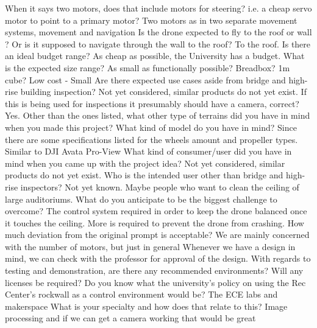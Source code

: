 \documentclass[12pt]{article}
\begin{document}
            \qna
            {When it says two motors, does that include motors for steering? i.e. a cheap servo motor to point to a primary motor?}
            {Two motors as in two separate movement systems, movement and navigation}
            \qna
            {Is the drone expected to fly to the roof or wall ? Or is it supposed to navigate through the wall to the roof?}
            {To the roof.}
            \qna
            {Is there an ideal budget range?}
            {As cheap as possible, the University has a budget.}
            \qna
            {What is the expected size range? As small as functionally possible? Breadbox? 1m cube?}
            {Low cost -\> Small}
            \qna
            {Are there expected use cases aside from bridge and high-rise building inspection?}
            {Not yet considered, similar products do not yet exist.}
            \qna
            {If this is being used for inspections it presumably should have a camera, correct?}
            {Yes.}
            \qna
            {Other than the ones listed, what other type of terrains did you have in mind when you made this project?}
            {}
            \qna
            {What kind of model do you have in mind? Since there are some specifications listed for the wheels amount and propeller types.}
            {Similar to DJI Avata Pro-View}
            \qna
            {What kind of consumer/user did you have in mind when you came up with the project idea?}
            {Not yet considered, similar products do not yet exist.}
            \qna
            {Who is the intended user other than bridge and high-rise inspectors?}
            {Not yet known. Maybe people who want to clean the ceiling of large auditoriums.}
            \qna
            {What do you anticipate to be the biggest challenge to overcome?}
            {The control system required in order to keep the drone balanced once it touches the ceiling. More is required to prevent the drone from crashing.}
            \qna
            {How much deviation from the original prompt is acceptable? We are mainly concerned with the number of motors, but just in general}
            {Whenever we have a design in mind, we can check with the professor for approval of the design.}
            \qna
            {With regards to testing and demonstration, are there any recommended environments? Will any licenses be required? Do you know what the university's policy on using the Rec Center's rockwall as a control environment would be?}
            {The ECE labs and makerspace}
            \qna
            {What is your specialty and how does that relate to this?}
            {Image processing and if we can get a camera working that would be great}
\end{document}
